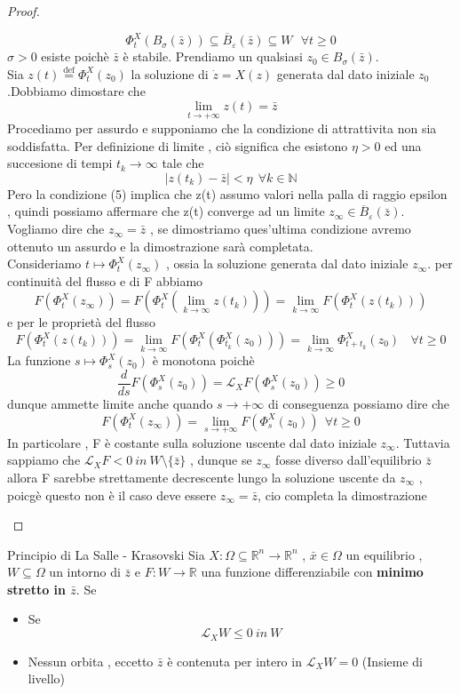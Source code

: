 \documentclass{article}
\theoremstyle{definition}
\newcommand{\R}{\mathbb{R}}
\newcommand{\Rn}{\R^n}
\begin{document}
\begin{proof}
\begin{enumerate}
 		\begin{equation}
\Phi^X_t(B_\sigma(\bar{z}))\subseteq \overline{B}_\varepsilon (\bar{z}) \subseteq W \ \ \ \forall t \geq 0
 		\end{equation}
 		 $\sigma > 0 $ esiste poichè $\bar{z}$ è stabile. Prendiamo un qualsiasi $z_0 \in B_\sigma(\bar{z})$.\\ Sia $z(t) \overset{\text{def}}{=}\Phi^X_t(z_0)$ la soluzione di $\dot{z}=X(z)$ generata dal dato iniziale $z_0$.Dobbiamo dimostare che 
 		$$\lim_{t \rightarrow +\infty}z(t)=\bar{z}$$
 		Procediamo per assurdo e supponiamo che la condizione di attrattivita non sia soddisfatta. Per definizione di limite , ciò significa che esistono $\eta > 0$ ed una succesione di tempi $t_k \rightarrow \infty$ tale che $$|z(t_k)-\bar{z}|<\eta  \ \ \forall k \in \mathbb{N}$$Pero la condizione (5) implica che z(t) assumo valori nella palla di raggio epsilon , quindi possiamo affermare che z(t) converge ad un limite $z_\infty \in \overline{B}_\varepsilon (\bar{z})$. Vogliamo dire che $z_\infty=\bar{z}$ , se dimostriamo ques'ultima condizione avremo ottenuto un assurdo e la dimostrazione sarà completata. \\ Consideriamo $t \mapsto \Phi^X_t(z_\infty)$ , ossia la soluzione generata dal dato iniziale $z_\infty $. per continuità del flusso e di F abbiamo 
 		$$F(\Phi^X_t(z_\infty ))=F(\Phi^X_t(\lim_{k\rightarrow \infty}z(t_k) ))=\lim_{k\rightarrow \infty}F(\Phi^X_t(z(t_k) ))$$ e per le proprietà del flusso 
 		$$F(\Phi^X_t(z(t_k) ))=\lim_{k\rightarrow \infty} F(\Phi^X_t( \Phi^X_{t_k}(z_0)))=\lim_{k\rightarrow \infty}\Phi^X_{t+t_k}(z_0) \ \ \ \ \forall t \geq 0$$ La funzione $s \mapsto \Phi^X_s(z_0)$ è monotona poichè 
 		$$\frac{d}{ds}F(\Phi^X_{s}(z_0))=\mathcal{L}_XF(\Phi^X_{s}(z_0))\geq 0$$ dunque ammette limite anche quando $s \rightarrow + \infty$ di conseguenza possiamo dire che 
 		$$F(\Phi^X_{t}(z_\infty))=\lim_{s\rightarrow +\infty}F(\Phi^X_{s}(z_0)) \ \ \forall t \geq 0$$ In particolare , F è costante sulla soluzione uscente dal dato iniziale $z_\infty $. Tuttavia sappiamo che $\mathcal{L}_XF < 0 \ in \ W \setminus \{\bar{z}\}$ , dunque se $z_\infty $ fosse diverso dall'equilibrio $\bar{z}$
  allora F sarebbe strettamente decrescente lungo la soluzione uscente da $z_\infty $ , poicgè questo non è il caso deve essere $z_\infty = \bar{z}$, cio completa la dimostrazione 	\end{enumerate}
 		\end{proof}
 		\begin{teo}{Principio di La Salle - Krasovski}{}
Sia  $X : \Omega \subseteq \Rn \rightarrow \Rn$ ,  $\bar{x} \in \Omega$ un equilibrio , $W \subseteq \Omega $ un intorno di $\bar{z}$ e $F : W \rightarrow \R$ una funzione differenziabile con \textbf{minimo stretto in $\bar{z}$}. Se
\begin{itemize}
	\item Se $$\mathcal{L}_XW \leq 0 \ in \ W$$
	\item Nessun orbita , eccetto $\bar{z}$ è contenuta per intero in $\mathscr{L}_XW=0$ (Insieme di livello) \footnotemark
\end{itemize}
 		\end{teo}
\end{document}
